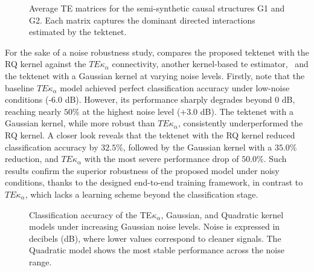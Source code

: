 \begin{figure}[htbp]
\centering
{}
{}
\caption{Average TE matrices for the semi-synthetic causal structures G1 and G2. Each matrix captures the dominant directed interactions estimated by the \gls{tektenet}.}
\label{fig:te_g1_g2_mat}
\end{figure}

For the sake of a noise robustness study,  compares the proposed \gls{tektenet} with the RQ kernel against the $TE\kappa_\alpha$ connectivity, another kernel-based \gls{te} estimator,~\cite{de2019data} and the \gls{tektenet} with a Gaussian kernel at varying noise levels. Firstly, note that the baseline $TE\kappa_\alpha$ model achieved perfect classification accuracy under low-noise conditions (-6.0 dB). However, its performance sharply degrades beyond 0 dB, reaching nearly $50\%$ at the highest noise level (+3.0 dB). The \gls{tektenet} with a Gaussian kernel, while more robust than $TE\kappa_\alpha$, consistently underperformed the RQ kernel. A closer look reveals that the \gls{tektenet} with the RQ kernel reduced classification accuracy by $32.5\%$, followed by the Gaussian kernel with a $35.0\%$ reduction, and $TE\kappa_\alpha$ with the most severe performance drop of $50.0\%$. Such results confirm the superior robustness of the proposed model under noisy conditions, thanks to the designed end-to-end training framework, in contrast to $TE\kappa_\alpha$, which lacks a learning scheme beyond the classification stage.
\begin{figure}[htbp]
  \centering
  
  \caption{Classification accuracy of the TE$\kappa_\alpha$, Gaussian, and Quadratic kernel models under increasing Gaussian noise levels. Noise is expressed in decibels (dB), where lower values correspond to cleaner signals. The Quadratic model shows the most stable performance across the noise range.}
  \label{fig:robustness-accuracy}
\end{figure}

